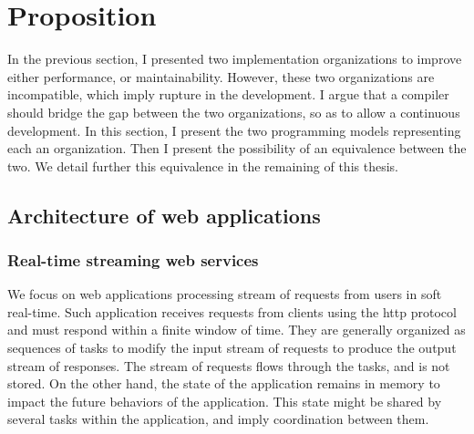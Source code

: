 \section{Proposition} \label{chapter2:proposition}

In the previous section, I presented two implementation organizations to improve either performance, or maintainability.
However, these two organizations are incompatible, which imply rupture in the development.
I argue that a compiler should bridge the gap between the two organizations, so as to allow a continuous development.
In this section, I present the two programming models representing each an organization.
Then I present the possibility of an equivalence between the two.
We detail further this equivalence in the remaining of this thesis.


\subsection{Architecture of web applications}

\subsubsection{Real-time streaming web services}


We focus on web applications processing stream of requests from users in soft real-time.
Such application receives requests from clients using the http protocol and must respond within a finite window of time.
They are generally organized as sequences of tasks to modify the input stream of requests to produce the output stream of responses.
The stream of requests flows through the tasks, and is not stored.
On the other hand, the state of the application remains in memory to impact the future behaviors of the application.
This state might be shared by several tasks within the application, and imply coordination between them.

